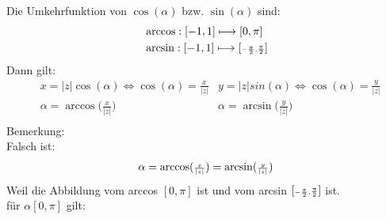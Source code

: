Die Umkehrfunktion von $ \cos(\alpha) $ bzw. $ \sin(\alpha) $ sind:\\
\begin{align*}
&\arccos: [-1,1]\longmapsto [0,\pi]\\
&\arcsin: [-1,1]\longmapsto [\scriptscriptstyle -\genfrac{}{}{}{\pi}{\pi}{2 },\genfrac{}{}{}{2}{\pi}{2 }\displaystyle ]
\end{align*}
Dann gilt:\\
\begin{align*}
&x=|z|\cos(\alpha)\Leftrightarrow \cos(\alpha)=\frac{x}{|z|}&y=|z|sin(\alpha)\Leftrightarrow \cos(\alpha)=\frac{y}{|z|}\\
&\alpha=\arccos \bigg(\frac{x}{|z| }\bigg)
&\alpha=\arcsin \bigg(\frac{y }{|z| }\bigg)\\
\end{align*}
Bemerkung:\\
Falsch ist:\\
\begin{align*}
\alpha=\arccos(\genfrac{}{}{}{2}{x}{|z| })=\arcsin(\genfrac{}{}{}{2}{y}{|z| })
\end{align*}
Weil die Abbildung vom arccos $[0,\pi]  $ ist und vom arcsin $ [\scriptscriptstyle -\genfrac{}{}{}{\pi}{\pi}{2 },\genfrac{}{}{}{2}{\pi}{2 }\displaystyle ] $ ist. \vspace*{4mm}\\
\textbullet \;\; für $ \alpha [0,\pi]$ gilt:\\

